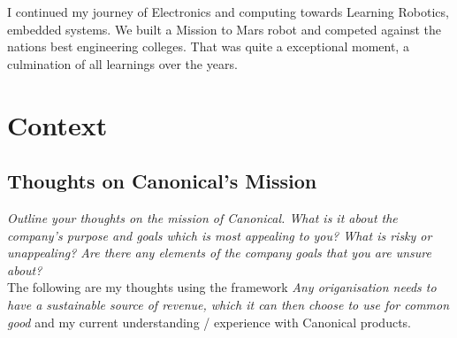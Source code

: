 \documentclass{article}
\begin{document}
I continued my journey of Electronics and computing towards Learning Robotics, embedded systems. 
We built a Mission to Mars robot and competed against the nations best engineering colleges. That was quite a exceptional
moment, a culmination of all learnings over the years.

\section{Context}
\subsection{Thoughts on Canonical’s Mission}
\small \textit{Outline your thoughts on the mission of Canonical. What is it about the company's purpose and goals which is most appealing to you? What is risky or unappealing? Are there any elements of the company goals that you are unsure about?} 
\normalsize 
\\[1em]
The following are my thoughts using the framework \textit{Any origanisation needs to have a sustainable source of revenue, 
which it can then choose to use for common good} and my current understanding / experience with Canonical products.
\end{document}
